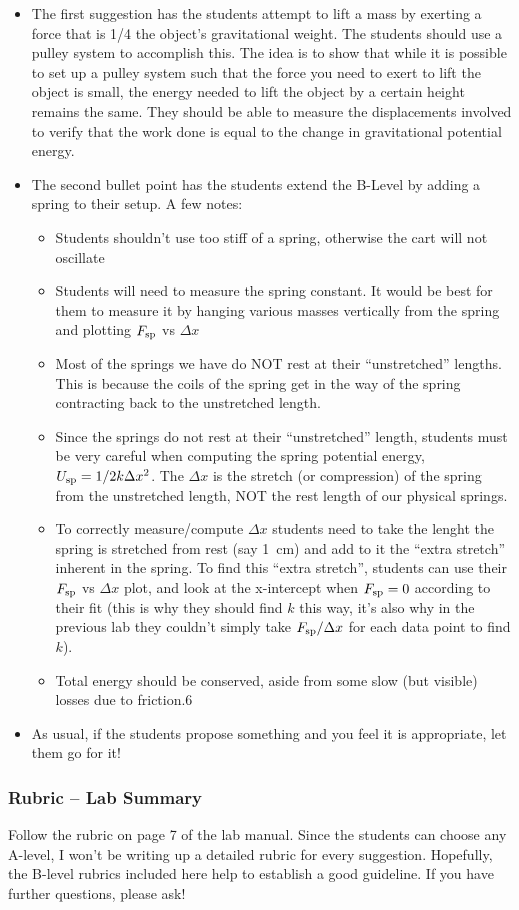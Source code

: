 \documentclass[fleqn,letterpaper]{article}
\begin{document}
\begin{itemize}
 \item{The first suggestion has the students attempt to lift a mass by exerting a force that is 1/4 the object's gravitational weight.  The students should use a pulley system to accomplish this.  The idea is to show that while it is possible to set up a pulley system such that the force you need to exert to lift the object is small, the energy needed to lift the object by a certain height remains the same.  They should be able to measure the displacements involved to verify that the work done is equal to the change in gravitational potential energy.}
 \item{The second bullet point has the students extend the B-Level by adding a spring to their setup.  A few notes:
  \begin{itemize}
  \item{Students shouldn't use too stiff of a spring, otherwise the cart will not oscillate}
  \item{Students will need to measure the spring constant.  It would be best for them to measure it by hanging various masses vertically from the spring and plotting $F_{\rm sp}$ vs $\Delta x$}
  \item{Most of the springs we have do NOT rest at their ``unstretched'' lengths.  This is because the coils of the spring get in the way of the spring contracting back to the unstretched length.}
  \item{Since the springs do not rest at their ``unstretched'' length, students must be very careful when computing the spring potential energy, $U_{\rm sp} = 1/2 k \Delta x^2$.  The $\Delta x$ is the stretch (or compression) of the spring from the unstretched length, NOT the rest length of our physical springs.}
  \item{To correctly measure/compute $\Delta x$ students need to take the lenght the spring is stretched from rest (say 1~cm) and add to it the ``extra stretch'' inherent in the spring.  To find this ``extra stretch'', students can use their $F_{\rm sp}$ vs $\Delta x$ plot, and look at the x-intercept when $F_{\rm sp} = 0$ according to their fit (this is why they should find $k$ this way, it's also why in the previous lab they couldn't simply take $F_{\rm sp}/\Delta x$ for each data point to find $k$)}.
  \item{Total energy should be conserved, aside from some slow (but visible) losses due to friction.}6
  \end{itemize}}
 \item{As usual, if the students propose something and you feel it is appropriate, let them go for it!}
\end{itemize}

\subsubsection*{Rubric -- Lab Summary}

Follow the rubric on page 7 of the lab manual.  Since the students can choose any A-level, I won't be writing up a detailed rubric for every suggestion.  Hopefully, the B-level rubrics included here help to establish a good guideline.  If you have further questions, please ask!

\label{LastPage}
\end{document}
